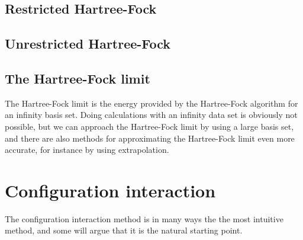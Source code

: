 \subsection{Restricted Hartree-Fock}

\subsection{Unrestricted Hartree-Fock}

\subsection{The Hartree-Fock limit}
The Hartree-Fock limit is the energy provided by the Hartree-Fock algorithm for an infinity basis set. Doing calculations with an infinity data set is obviously not possible, but we can approach the Hartree-Fock limit by using a large basis set, and there are also methods for approximating the Hartree-Fock limit even more accurate, for instance by using extrapolation. 

\section{Configuration interaction} \label{sec:ci}
The configuration interaction method is in many ways the the most intuitive method, and some will argue that it is the natural starting point. 

